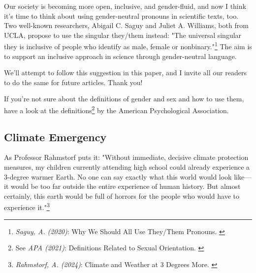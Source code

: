 Our society is becoming more open, inclusive, and gender-fluid, and now I think it's time to think about using gender-neutral pronouns in scientific texts, too. Two well-known researchers, Abigail C. Saguy and Juliet A. Williams, both from UCLA, propose to use the singular they/them instead: "The universal singular they is inclusive of people who identify as male, female or nonbinary."\footnote{\textit{Saguy, A. (2020)}: Why We Should All Use They/Them Pronouns. \cite{pronouns}} The aim is to support an inclusive approach in science through gender-neutral language. 

We'll attempt to follow this suggestion in this paper, and I invite all our readers to do the same for future articles. Thank you!

If you're not sure about the definitions of gender and sex and how to use them, have a look at the definitions\footnote{See \textit{APA (2021)}: Definitions Related to Sexual Orientation. \cite{apaDefinitions}} by the American Psychological Association.

\subsection{Climate Emergency}

As Professor Rahmstorf puts it: "Without immediate, decisive climate protection measures, my children currently attending high school could already experience a 3-degree warmer Earth. No one can say exactly what this world would look like—it would be too far outside the entire experience of human history. But almost certainly, this earth would be full of horrors for the people who would have to experience it."\footnote{\textit{Rahmstorf, A. (2024)}: Climate and Weather at 3 Degrees More. \cite{3dgreesMore}}
